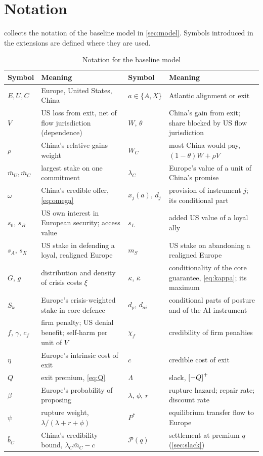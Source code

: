 \section{Notation}\label{app:notation}

 collects the notation of the baseline model in \cref{sec:model}. Symbols introduced in the extensions are defined where they are used.

\begin{table}[h]
\centering
\small
\caption{Notation for the baseline model}\label{tab:notation}
\begin{tabularx}{\textwidth}{@{}l>{\raggedright\arraybackslash}Xl>{\raggedright\arraybackslash}X@{}}
\toprule
Symbol & Meaning & Symbol & Meaning\\
\midrule
$E,U,C$ & Europe, United States, China & $a\in\{A,X\}$ & Atlantic alignment or exit\\
$V$ & US loss from exit, net of flow jurisdiction (dependence) & $W$, $\theta$ & China's gain from exit; share blocked by US flow jurisdiction\\
$\rho$ & China's relative-gains weight & $W_C$ & most China would pay, $(1-\theta)W+\rho V$\\
$\bar m_U,\bar m_C$ & largest stake on one commitment & $\lambda_C$ & Europe's value of a unit of China's promise\\
$\omega$ & China's credible offer, \cref{eq:omega} & $x_j(a)$, $d_j$ & provision of instrument $j$; its conditional part\\
$s_0$, $s_B$ & US own interest in European security; access value & $s_L$ & added US value of a loyal ally\\
$s_A$, $s_X$ & US stake in defending a loyal, realigned Europe & $m_S$ & US stake on abandoning a realigned Europe\\
$G$, $g$ & distribution and density of crisis costs $\xi$ & $\kappa$, $\bar\kappa$ & conditionality of the core guarantee, \cref{eq:kappa}; its maximum\\
$S_k$ & Europe's crisis-weighted stake in core defence & $d_p$, $d_{ai}$ & conditional parts of posture and of the AI instrument\\
$f$, $\gamma$, $c_f$ & firm penalty; US denial benefit; self-harm per unit of $V$ & $\chi_f$ & credibility of firm penalties\\
$\eta$ & Europe's intrinsic cost of exit & $c$ & credible cost of exit\\
$Q$ & exit premium, \cref{eq:Q} & $\Lambda$ & slack, $\left[-Q\right]^{+}$\\
$\beta$ & Europe's probability of proposing & $\lambda$, $\phi$, $r$ & rupture hazard; repair rate; discount rate\\
$\psi$ & rupture weight, $\lambda/(\lambda+r+\phi)$ & $P^*$ & equilibrium transfer flow to Europe\\
$\bar b_C$ & China's credibility bound, $\lambda_C\bar m_C-c$ & $\mathcal P(q)$ & settlement at premium $q$ (\cref{sec:slack})\\
\bottomrule
\end{tabularx}
\end{table}
